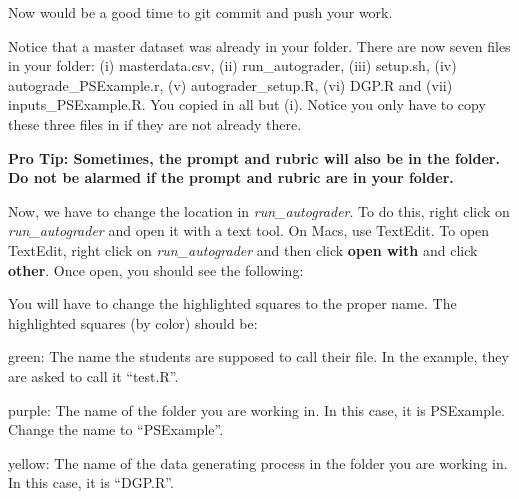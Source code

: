 \documentclass[
]{article}
\begin{document}
Now would be a good time to git commit and push your work.

Notice that a master dataset was already in your folder. There are now
seven files in your folder: (i) masterdata.csv, (ii) run\_autograder,
(iii) setup.sh, (iv) autograde\_PSExample.r, (v) autograder\_setup.R,
(vi) DGP.R and (vii) inputs\_PSExample.R. You copied in all but (i).
Notice you only have to copy these three files in if they are not
already there.

\textbf{Pro Tip: Sometimes, the prompt and rubric will also be in the
folder. Do not be alarmed if the prompt and rubric are in your folder.}

Now, we have to change the location in \emph{run\_autograder}. To do
this, right click on \emph{run\_autograder} and open it with a text
tool. On Macs, use TextEdit. To open TextEdit, right click on
\emph{run\_autograder} and then click \textbf{open with} and click
\textbf{other}. Once open, you should see the following:

\begin{center}
\end{center}

You will have to change the highlighted squares to the proper name. The
highlighted squares (by color) should be:

green: The name the students are supposed to call their file. In the
example, they are asked to call it ``test.R''.

purple: The name of the folder you are working in. In this case, it is
PSExample. Change the name to ``PSExample''.

yellow: The name of the data generating process in the folder you are
working in. In this case, it is ``DGP.R''.
\end{document}
